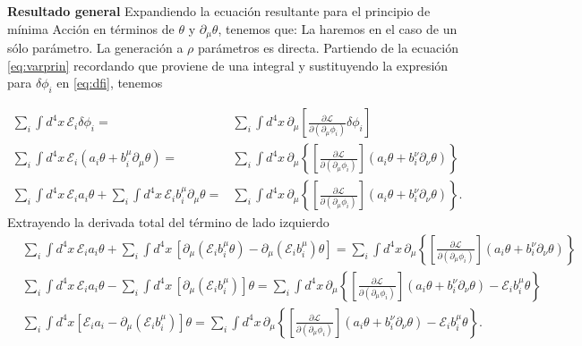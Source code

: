 \textbf{Resultado general}
Expandiendo la ecuación resultante para el principio de mínima Acción en términos de $\theta$ y $\partial_\mu\theta$, tenemos que:
La haremos en el caso de un sólo parámetro. La generación a $\rho$ parámetros es directa. Partiendo de la ecuación \eqref{eq:varprin} recordando que proviene de una integral y sustituyendo la expresión para $\delta\phi_i$ en \eqref{eq:dfi}, tenemos
\begin{frame}
\begin{align}
    \sum_i\int {d^4}x\, \mathcal{E}_i \delta\phi_i = & \sum_{i}\int {d^4}x\, \partial_{\mu} \left[  \frac{\partial\mathcal{L}}{\partial(\partial_{\mu}\phi_i)}\delta\phi_i \right]\nonumber\\
      \sum_i \int {d^4}x\, \mathcal{E}_i \left( a_i \theta +b^{\mu}_i \partial_{\mu}\theta \right) =&  \sum_i \int {d^4}x\, \partial_{\mu} \left\{ \left[ \frac{\partial\mathcal{L}}{\partial(\partial_{\mu}\phi_i)}\right] \left( a_i \theta +b^{\nu}_i \partial_{\nu}\theta \right)  \right\}\nonumber\\
      \sum_i \int {d^4}x\, \mathcal{E}_ia_i \theta+\sum_i \int {d^4}x\, \mathcal{E}_i b^{\mu}_i \partial_{\mu}\theta  =&  \sum_i \int {d^4}x\, \partial_{\mu} \left\{ \left[ \frac{\partial\mathcal{L}}{\partial(\partial_{\mu}\phi_i)}\right] \left( a_i \theta +b^{\nu}_i \partial_{\nu}\theta \right)  \right\}.
\end{align}
Extrayendo la derivada total del término de lado izquierdo 
\begin{align}
\label{eq:tn1}
   &   \sum_i \int {d^4}x\, \mathcal{E}_ia_i \theta+\sum_i \int {d^4}x\, \left[ \partial_{\mu} \left(  \mathcal{E}_i b^{\mu}_i \theta \right)-\partial_{\mu} \left(  \mathcal{E}_i b^{\mu}_i  \right) \theta \right]  =  \sum_i \int {d^4}x\, \partial_{\mu} \left\{ \left[ \frac{\partial\mathcal{L}}{\partial(\partial_{\mu}\phi_i)}\right] \left( a_i \theta +b^{\nu}_i \partial_{\nu}\theta \right)  \right\}\nonumber\\
&        \sum_i \int {d^4}x\, \mathcal{E}_ia_i \theta-\sum_i \int {d^4}x\, \left[ \partial_{\mu}   \left(  \mathcal{E}_i b^{\mu}_i  \right) \right] \theta   =  \sum_i \int {d^4}x\, \partial_{\mu} \left\{ \left[ \frac{\partial\mathcal{L}}{\partial(\partial_{\mu}\phi_i)}\right] \left( a_i \theta +b^{\nu}_i \partial_{\nu}\theta \right) -\mathcal{E}_i b^{\mu}_i \theta  \right\} \nonumber\\
&        \sum_i\int {d^4}x \left[ \mathcal{E}_ia_i -  \partial_{\mu}   \left(  \mathcal{E}_i b^{\mu}_i  \right) \right]  \theta   =  \sum_i \int {d^4}x\, \partial_{\mu} \left\{ \left[ \frac{\partial\mathcal{L}}{\partial(\partial_{\mu}\phi_i)}\right] \left( a_i \theta +b^{\nu}_i \partial_{\nu}\theta \right) -\mathcal{E}_i b^{\mu}_i \theta  \right\}.
\end{align}


\end{frame}
